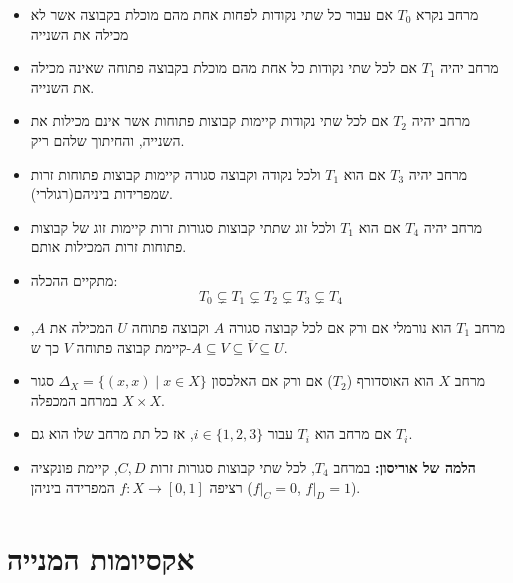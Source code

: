 \documentclass{tstextbook}
\begin{document}
\begin{summary}
  \begin{itemize}
    \item מרחב נקרא \(T_{0}\) אם עבור כל שתי נקודות לפחות אחת מהם מוכלת בקבוצה אשר לא מכילה את השנייה
    \item מרחב יהיה \(T_{1}\) אם לכל שתי נקודות כל אחת מהם מוכלת בקבוצה פתוחה שאינה מכילה את השנייה.
    \item מרחב יהיה \(T_{2}\) אם לכל שתי נקודות קיימות קבוצות פתוחות אשר אינם מכילות את השנייה, והחיתוך שלהם ריק.
    \item מרחב יהיה \(T_{3}\) אם הוא \(T_{1}\) ולכל נקודה וקבוצה סגורה קיימות קבוצות פתוחות זרות שמפרידות ביניהם(רגולרי).
    \item מרחב יהיה \(T_{4}\) אם הוא \(T_{1}\) ולכל זוג שתתי קבוצות סגורות זרות קיימות זוג של קבוצות פתוחות זרות המכילות אותם.
    \item מתקיים ההכלה:
$$T_{0}\subsetneq T_{1}\subsetneq T_{2}\subsetneq T_{3}\subsetneq T_{4}$$
    \item מרחב \(T_1\) הוא נורמלי אם ורק אם לכל קבוצה סגורה \(A\) וקבוצה פתוחה \(U\) המכילה את \(A\), קיימת קבוצה פתוחה \(V\) כך ש-\(A \subseteq V \subseteq \overline{V} \subseteq U\).
    \item מרחב \(X\) הוא האוסדורף (\(T_2\)) אם ורק אם האלכסון \(\Delta_X = \{(x,x) \mid x \in X\}\) סגור במרחב המכפלה \(X \times X\).
    \item אם מרחב הוא \(T_i\) עבור \(i \in \{1, 2, 3\}\), אז כל תת מרחב שלו הוא גם \(T_i\).
    \item \textbf{הלמה של אוריסון:} במרחב \(T_4\), לכל שתי קבוצות סגורות זרות \(C, D\), קיימת פונקציה רציפה \(f: X \to [0,1]\) המפרידה ביניהן (\(f|_C = 0\), \(f|_D = 1\)).
  \end{itemize}
\end{summary}
\section{אקסיומות המנייה}
\end{document}
